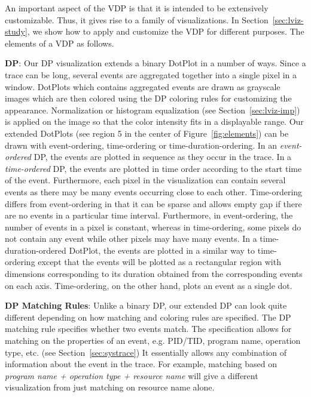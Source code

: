 An important aspect of the VDP is that it is intended to
be extensively customizable. Thus, it gives rise to a family of visualizations.
In Section~\ref{sec:lviz-study}, we show how to apply and customize
the VDP for different purposes. The elements of a VDP as follows.

{\bf DP}:
Our DP visualization extends a binary DotPlot in a number of ways.
Since a trace can be long, several events are aggregated
together into a single pixel in a window.
DotPlots which contains aggregated events are drawn as grayscale images
which are then colored using the DP coloring rules for customizing
the appearance.
Normalization or histogram equalization (see Section~\ref{sec:lviz-imp})
is applied on the image so that the color intensity fits in a displayable range.
Our extended DotPlots (see region 5 in the center of Figure~\ref{fig:elements})
can be drawn with event-ordering, time-ordering or time-duration-ordering.
In an {\em event-ordered} DP, the events are plotted in
sequence as they occur in the trace.
In a {\em time-ordered} DP, the events are plotted in time order
according to the start time of the event.
Furthermore, each pixel in the visualization can contain several events
as there may be many events occurring close to each other.
Time-ordering differs from event-ordering in that it can be sparse
and allows empty gap if there are no events in a particular time interval.
Furthermore, in event-ordering,
the number of events in a pixel is constant, whereas
in time-ordering,
some pixels do not contain any event while other pixels may have many events.
In a time-duration-ordered DotPlot, the events are plotted in a similar way
to time-ordering
except that the events will be plotted as a rectangular region
with dimensions corresponding to its duration obtained from
the corresponding events on each axis.
Time-ordering, on the other hand, plots
an event as a single dot.

{\bf DP Matching Rules}:
Unlike a binary DP, our extended DP can look quite different depending
on how matching and coloring rules are specified.
The DP matching rule specifies whether two events
match. The specification allows for matching on
the properties of an event, e.g. PID/TID, program name,
operation type, etc. (see Section~\ref{sec:systrace})
It essentially allows any combination of information about
the event in the trace.
For example, matching based on {\it program name + operation type + resource name}
will give a different visualization from just matching on resource name alone.

